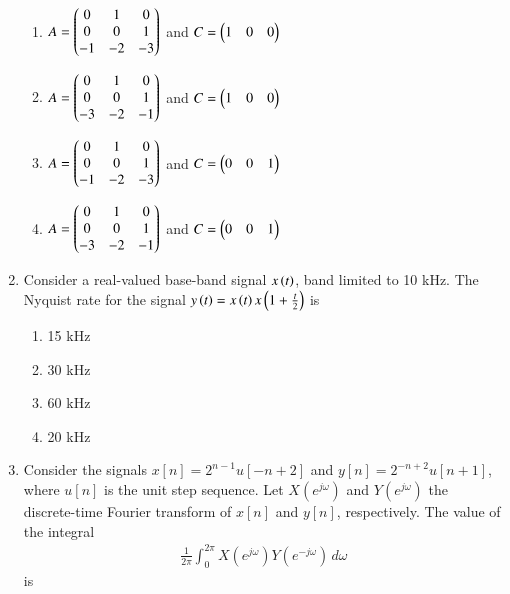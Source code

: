 \begin{enumerate}[label=\arabic*.,ref=\theenumi]
\begin{enumerate}[label = (\Alph*)]
    \item $A = \begin{pmatrix}
     0 &  1 &  0\\ 
     0 &  0 &  1\\
    -1 & -2 & -3
    \end{pmatrix}$ and $C = \begin{pmatrix}1 & 0 & 0\end{pmatrix}$
    \item $A = \begin{pmatrix}
     0 &  1 &  0\\ 
     0 &  0 &  1\\
    -3 & -2 & -1
    \end{pmatrix}$ and $C = \begin{pmatrix}1 & 0 & 0\end{pmatrix}$
    \item $A = \begin{pmatrix}
     0 &  1 &  0\\ 
     0 &  0 &  1\\
    -1 & -2 & -3
    \end{pmatrix}$ and $C = \begin{pmatrix}0 & 0 & 1\end{pmatrix}$
    \item $A = \begin{pmatrix}
     0 &  1 &  0\\ 
     0 &  0 &  1\\
    -3 & -2 & -1
    \end{pmatrix}$ and $C = \begin{pmatrix}0 & 0 & 1\end{pmatrix}$
    \end{enumerate}
%
\solution

%
\item Consider a real-valued base-band signal $x\left(t\right)$, band limited to 10 kHz. The Nyquist rate for the signal $y\left(t\right) = x\left(t\right)x\left(1+\frac{t}{2}\right)$ is
\begin{enumerate}
    \item 15 kHz
    \item 30 kHz
    \item 60 kHz
    \item 20 kHz
\end{enumerate}
\solution

%
\item Consider  the  signals  $x[n]=2^{n-1}u[-n+2]$ and $y[n]=2^{-n+2}u[n+1]$, 
where $u[n]$ is the unit step sequence. Let $X(e^{j\omega})$ and $Y(e^{j\omega})$ the discrete-time  Fourier  transform  of  $x[n]$  and  $y[n]$,  respectively.  The  value  of  the 
integral 
\begin{align}
    \frac{1}{2\pi} \int_{0}^{2\pi} X(e^{j\omega}) Y(e^{-j\omega}) \, d\omega
\end{align}
is
\solution

\end{enumerate}